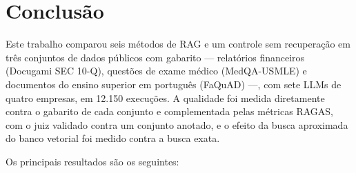 \section{Conclusão}
\label{sc:conclusao}

Este trabalho comparou seis métodos de RAG e um controle sem recuperação em três conjuntos de dados públicos com gabarito --- relatórios financeiros (Docugami SEC 10-Q), questões de exame médico (MedQA-USMLE) e documentos do ensino superior em português (FaQuAD) ---, com sete LLMs de quatro empresas, em 12.150 execuções. A qualidade foi medida diretamente contra o gabarito de cada conjunto e complementada pelas métricas RAGAS, com o juiz validado contra um conjunto anotado, e o efeito da busca aproximada do banco vetorial foi medido contra a busca exata.

Os principais resultados são os seguintes:

